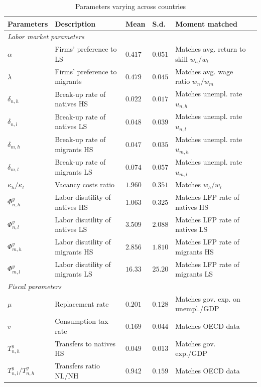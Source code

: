 \documentclass[a4paper,12pt]{article}
\begin{document}
\begin{table}[htb!]
\centering
\par
\caption{Parameters varying across countries} \label{tab:parameters_country_specific}
\footnotesize
\begin{tabular}{llllll}
\hline\hline
Parameters & Description & Mean & S.d. & Moment matched \\ \hline
\multicolumn{5}{l}{\textit{Labor market parameters}} \\ \hline
$\alpha$ & Firms' preference to LS & $0.417$ & $0.051$ & Matches avg. return to skill $w_h/w_l$\\
$\lambda$ & Firms' preference to migrants & $0.479$ & $0.045$ & Matches avg. wage ratio $w_n/w_m$\\
$\delta_{n,h}$ & Break-up rate of natives HS & $0.022$ & $0.017$ & Matches unempl. rate $u_{n,h}$\\
$\delta_{n,l}$ & Break-up rate of natives LS & $0.048$ & $0.039$ & Matches unempl. rate $u_{n,l}$\\
$\delta_{m,h}$ & Break-up rate of migrants HS & $0.047$ & $0.035$ & Matches unempl. rate $u_{m,h}$\\
$\delta_{m,l}$ & Break-up rate of migrants LS & $0.074$ & $0.057$ & Matches unempl. rate $u_{m,l}$\\
$\kappa_h/\kappa_l$ & Vacancy costs ratio & $1.960$ & $0.351$ & Matches  $w_h/w_l$\\
$\Phi^y_{n,h}$ & Labor disutility of natives HS & $1.063$ & $0.325$ & Matches  LFP rate of natives HS\\
$\Phi^y_{n,l}$ & Labor disutility of natives LS & $3.509$ & $2.088$ & Matches  LFP rate of natives LS\\
$\Phi^y_{m,h}$ & Labor disutility of migrants HS & $2.856$ & $1.810$ & Matches  LFP rate of migrants HS\\
$\Phi^y_{m,l}$ & Labor disutility of migrants LS & $16.33$ & $25.20$ & Matches  LFP rate of migrants LS\\
\hline
\multicolumn{5}{l}{\textit{Fiscal parameters}} \\ \hline
$\mu$ & Replacement rate & $0.201$ & $0.128$ & Matches gov. exp. on unempl./GDP\\
$v$ & Consumption tax rate & $0.169$ & $0.044$ & Matches OECD data\\
$T^y_{n,h}$ & Transfers to natives HS & $0.049$ & $0.013$& Matches gov. exp./GDP \\
$T^y_{n,l}/T^y_{n,h}$ & Transfers ratio NL/NH & $0.942$ &$0.159$ & Matches OECD data\\

\end{tabular}
\end{table}
\end{document}
